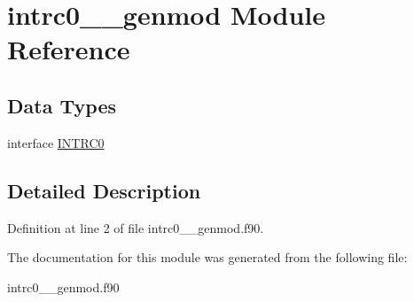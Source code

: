 \hypertarget{classintrc0____genmod}{\section{intrc0\+\_\+\+\_\+genmod Module Reference}
\label{classintrc0____genmod}
}
\subsection*{Data Types}
\begin{DoxyCompactItemize}
\item 
interface \hyperlink{interfaceintrc0____genmod_1_1_i_n_t_r_c0}{I\+N\+T\+R\+C0}
\end{DoxyCompactItemize}


\subsection{Detailed Description}


Definition at line 2 of file intrc0\+\_\+\+\_\+genmod.\+f90.



The documentation for this module was generated from the following file\+:\begin{DoxyCompactItemize}
\item 
intrc0\+\_\+\+\_\+genmod.\+f90\end{DoxyCompactItemize}
